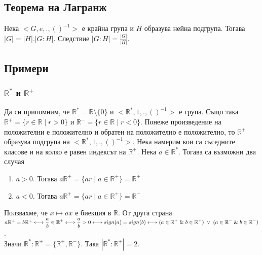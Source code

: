 \documentclass[12pt]{article}
\begin{document}
\subsection{Теорема на Лагранж}
Нека \(<G, e, . , ()^{-1}>\) е крайна група и \(H\) образува нейна подгрупа.
Тогава \(|G| = |H|.|G : H|\). Следствие \(|G : H| = \displaystyle\frac{|G|}{|H|}\).
\subsection{Примери}
\subsubsection{\(\mathbb{R}^*\) и \(\mathbb{R}^+\)}
Да си припомним, че \(\mathbb{R}^* = \mathbb{R} \setminus \{0\}\)
и \(<\mathbb{R}^*, 1, . , ()^{-1}>\) е група. Също така
\(\mathbb{R}^+ = \{r \in \mathbb{R} \; | \; r > 0\}\)
и \(\mathbb{R}^- = \{r \in \mathbb{R} \; | \; r < 0\}\).
Понеже произведение на положителни е положително и обратен на положително е положително, то \(\mathbb{R}^+\) образува подгрупа на \(<\mathbb{R}^*, 1, . , ()^{-1}>\).
Нека намерим кои са съседните класове и на колко е равен индексът на \(\mathbb{R}^+\).
Нека \(a \in \mathbb{R}^*\). Тогава са възможни два случая
\begin{enumerate}
    \item \(a > 0\). Тогава \(a\mathbb{R}^+ = \{ar \; | \; a \in \mathbb{R}^+ \} = \mathbb{R}^+ \)
    \item \(a < 0\). Тогава \(a\mathbb{R}^+ = \{ar \; | \; a \in \mathbb{R}^+ \} = \mathbb{R}^-\)
\end{enumerate}
Ползвахме, че \(x \mapsto ax\) е биекция в \(\mathbb{R}\).
От друга страна \\
\(a\mathbb{R}^+ = b\mathbb{R}^+ \longleftrightarrow \displaystyle\frac{a}{b} \in \mathbb{R}^+ \longleftrightarrow \displaystyle\frac{a}{b} > 0 \longleftrightarrow sign(a) = sign(b) \longleftrightarrow \\
(a \in \mathbb{R}^+ \; \& \; b \in \mathbb{R}^+) \; \lor \; (a \in \mathbb{R}^- \; \& \; b \in \mathbb{R}^-)\).\\
Значи \(\mathbb{R}^* : \mathbb{R}^+ = \{\mathbb{R}^+, \mathbb{R}^- \}\).
Така \(|\mathbb{R}^* : \mathbb{R}^+| = 2\).
\end{document}
